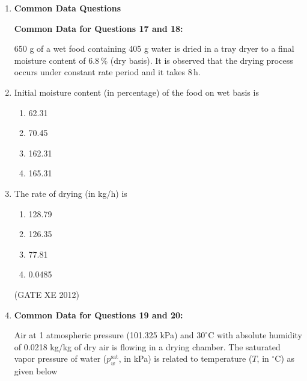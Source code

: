 \documentclass[12pt]{article}
\begin{document}
\begin{enumerate}
\begin{multicols}{2}
\begin{enumerate}
\item P-4, Q-2, R-1, S-3  
\item P-4, Q-1, R-2, S-3  
\item P-4, Q-3, R-2, S-1  
\item P-3, Q-1, R-4, S-2  
\end{enumerate}
\end{multicols}
(GATE XE 2012)

\item[] {\large \textbf{Common Data Questions}}

\textbf{Common Data for Questions 17 and 18:}

650 g of a wet food containing 405 g water is dried in a tray dryer to a final moisture content of $6.8 \, \%$ (dry basis). It is observed that the drying process occurs under constant rate period and it takes $8 \, \text{h}$.

\item Initial moisture content (in percentage) of the food on wet basis is  

\begin{multicols}{4}
\begin{enumerate}
\item 62.31  
\item 70.45  
\item 162.31  
\item 165.31  
\end{enumerate}
\end{multicols}

\item The rate of drying (in kg/h) is  

\begin{multicols}{4}
\begin{enumerate}
\item 128.79  
\item 126.35  
\item 77.81  
\item 0.0485  
\end{enumerate}
\end{multicols}
(GATE XE 2012)

\item[] \textbf{Common Data for Questions 19 and 20:}

Air at 1 atmospheric pressure (101.325 kPa) and $30^\circ$C with absolute humidity of 0.0218 kg/kg of dry air is flowing in a drying chamber. The saturated vapor pressure of water ($p_{w}^{\text{sat}}$, in kPa) is related to temperature ($T$, in $^\circ$C) as given below


\end{enumerate}
\end{document}
